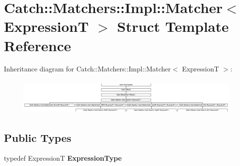 \hypertarget{struct_catch_1_1_matchers_1_1_impl_1_1_matcher}{}\section{Catch\+:\+:Matchers\+:\+:Impl\+:\+:Matcher$<$ ExpressionT $>$ Struct Template Reference}
\label{struct_catch_1_1_matchers_1_1_impl_1_1_matcher}
Inheritance diagram for Catch\+:\+:Matchers\+:\+:Impl\+:\+:Matcher$<$ ExpressionT $>$\+:\begin{figure}[H]
\begin{center}
\leavevmode
\includegraphics[height=1.879195cm]{struct_catch_1_1_matchers_1_1_impl_1_1_matcher}
\end{center}
\end{figure}
\subsection*{Public Types}
\begin{DoxyCompactItemize}
\item 
\mbox{\label{struct_catch_1_1_matchers_1_1_impl_1_1_matcher_a7f5068cbacd1eed06cf243e63446e7e1}} 
typedef ExpressionT {\bfseries Expression\+Type}
\end{DoxyCompactItemize}

